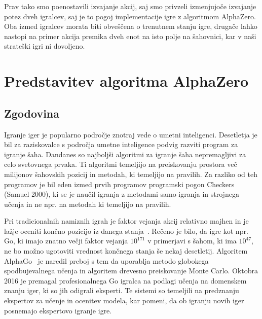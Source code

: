 \documentclass[a4paper, 12pt]{book}
\begin{document}
Prav tako smo poenostavili izvajanje akcij, saj smo privzeli izmenjujoče izvajanje potez dveh igralcev, saj je to pogoj implementacije igre z algoritmom AlphaZero.
Oba izmed igralcev morata biti obveščena o trenutnem stanju igre, drugače lahko nastopi na primer akcija premika dveh enot na isto polje na šahovnici, kar v naši strateški igri ni dovoljeno.


\chapter{Predstavitev algoritma AlphaZero}
\label{alphazero}
\section{Zgodovina}

Igranje iger je popularno področje znotraj vede o umetni inteligenci. 
Desetletja je bil za raziskovalce s področja umetne inteligence podvig razviti program za igranje šaha.
Dandanes so najboljši algoritmi za igranje šaha nepremagljivi za celo svetovnega prvaka.
Ti algoritmi temeljijo na preiskovanju prostora več milijonov šahovskih pozicij in metodah, ki temeljijo na pravilih.
Za razliko od teh programov je bil eden izmed prvih programov programski pogon Checkers (Samuel 2000), ki se je naučil igranja z metodami samo-igranja in strojnega učenja in ne npr. na metodah ki temeljijo na pravilih.

Pri tradicionalnih namiznih igrah je faktor vejanja akcij relativno majhen in je lažje oceniti končno pozicijo iz danega stanja~\cite{wiki:AlphaGo}.
Rečeno je bilo, da igre kot npr. Go, ki imajo znatno večji faktor vejanja $10^{171}$ v primerjavi s šahom, ki ima $10^{47}$, ne bo možno ugotoviti vrednost končnega stanja še nekaj desetletij.
Algoritem AlphaGo~\cite{silver2016mastering} je naredil preboj s tem da uporablja metodo globokega spodbujevalnega učenja in algoritem drevesno preiskovanje Monte Carlo. 
Oktobra 2016 je premagal profesionalnega Go igralca na podlagi učenja na domenskem znanju iger, ki so jih odigrali eksperti.
Te sistemi so temeljili na predznanju ekspertov za učenje in ocenitev modela, kar pomeni, da ob igranju novih iger posnemajo ekspertovo igranje igre.
\end{document}
